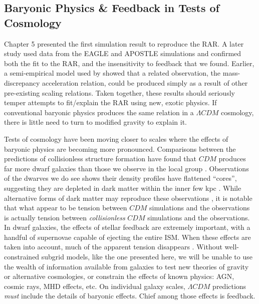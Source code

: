 \subsection{Baryonic Physics \& Feedback in Tests of Cosmology}
Chapter 5 presented the first simulation result to reproduce the
\citet{McGaugh2016} RAR.  A later study \citep{Ludlow2016} used data from the
EAGLE \citep{Schaye2015} and APOSTLE \citep{Sawala2016} simulations and
confirmed both the fit to the RAR, and the insensitivity to feedback that we
found.  Earlier, a semi-empirical model used by \citet{DiCintio2016} showed
that a related observation, the mass-discrepancy acceleration relation, could be
produced simply as a result of other pre-existing scaling relations.  Taken
together, these results should seriously temper attempts to fit/explain the RAR
using new, exotic physics.  If conventional baryonic physics produces the same
relation in a $\Lambda CDM$ cosmology, there is little need to turn to modified
gravity \citep{Moffat2016,Verlinde2016,Burrage2016} to explain it.  

Tests of cosmology have been moving closer to scales where the effects of
baryonic physics are becoming more pronounced.  Comparisons between the
predictions of collisionless structure formation have found that $CDM$ produces
far more dwarf galaxies than those we observe in the local group
\citep{Klypin1999,Boylan-Kolchin2011}. Observations of the dwarves we do see
shows their density profiles have flattened ``cores'', suggesting they are
depleted in dark matter within the inner few kpc \citep{Moore1994,Simon2005}.
While alternative forms of dark matter may reproduce these observations
\citep{Spergel2000,Avila-Reese2001}, it is notable that what appear to be
tension between $CDM$ simulations and the observations is actually tension
between {\it collisionless} $CDM$ simulations and the observations.  In dwarf
galaxies, the effects of stellar feedback are extremely important, with a
handful of supernovae capable of ejecting the entire ISM.  When these effects
are taken into account, much of the apparent tension disappears
\citep{Mashchenko2006,Pontzen2012,Sawala2016}.  Without well-constrained subgrid
models, like the one presented here, we will be unable to use the wealth of
information available from galaxies to test new theories of gravity or
alternative cosmologies, or constrain the effects of known physics: AGN, cosmic
rays, MHD effects, etc.  On individual galaxy scales, $\Lambda CDM$ predictions
{\it must} include the details of baryonic effects.  Chief among those effects
is feedback.

